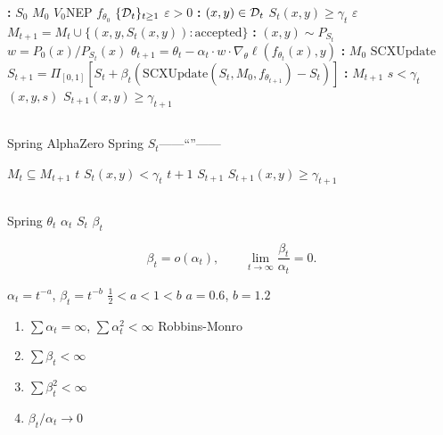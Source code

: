 \begin{algorithm}[ht]
\caption{Spring }
\label{alg:spring}
\begin{algorithmic}[1]
\State \textbf{:}  $S_0$ $M_0$ $V_0$NEP  $f_{\theta_0}$ $\{\mathcal{D}_t\}_{t \geq 1}$ $\varepsilon > 0$
    \State \textbf{:}  $(x,y) \in \mathcal{D}_{t}$  $S_t(x,y) \geq \gamma_t$  $\varepsilon$ 
    \State $M_{t+1} = M_t \cup \{(x, y, S_t(x,y)) : \text{accepted}\}$
    \State \textbf{:}  $(x, y) \sim P_{S_t}$ $w = P_0(x)/P_{S_t}(x)$
    \State $\theta_{t+1} = \theta_t - \alpha_t \cdot w \cdot \nabla_\theta \ell(f_{\theta_t}(x), y)$
    \State \textbf{:}  $M_0$  $\text{SCXUpdate}$
    \State $S_{t+1} = \Pi_{[0,1]}[S_t + \beta_t (\text{SCXUpdate}(S_t, M_0, f_{\theta_{t+1}}) - S_t)]$
    \State \textbf{:}  $M_{t+1}$  $s < \gamma_t$  $(x, y, s)$
    \State \quad  $S_{t+1}(x,y) \geq \gamma_{t+1}$
\EndFor
\end{algorithmic}
\end{algorithm}

\subsection{}

Spring \textit{} AlphaZero  Spring  $S_t$——``''——

 $M_t \subseteq M_{t+1}$  $t$  $S_t(x,y) < \gamma_t$ $t+1$  $S_{t+1}$  $S_{t+1}(x,y) \geq \gamma_{t+1}$

\subsection{}

Spring  $\theta_t$  $\alpha_t$ $S_t$  $\beta_t$

\begin{equation}\label{eq:twotimescale}
    \beta_t = o(\alpha_t), \quad \text{} \quad \lim_{t \to \infty} \frac{\beta_t}{\alpha_t} = 0.
\end{equation}

 $\alpha_t = t^{-a}$, $\beta_t = t^{-b}$ $\frac{1}{2} < a < 1 < b$ $a = 0.6$, $b = 1.2$
\begin{enumerate}[nosep, label=(\roman*)]
    \item $\sum \alpha_t = \infty$, $\sum \alpha_t^2 < \infty$ Robbins-Monro 
    \item $\sum \beta_t < \infty$
    \item $\sum \beta_t^2 < \infty$
    \item $\beta_t/\alpha_t \to 0$
\end{enumerate}


